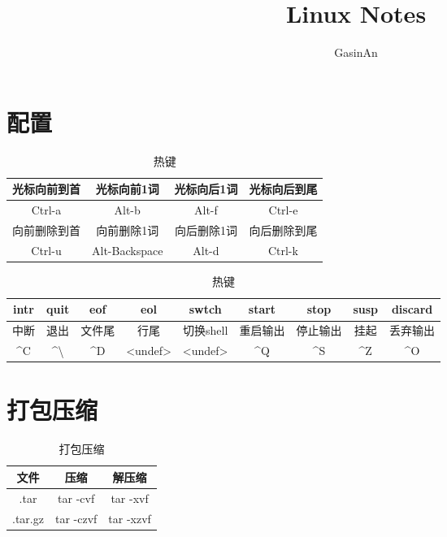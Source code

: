 \documentclass[12pt]{ctexart}
\title{Linux Notes}
\author{GasinAn}
\theoremstyle{definition}
\begin{document}
    \maketitle

    \tableofcontents

    \section{配置}

    \begin{table}[htbp]
        \centering
        \begin{tabular}{|c|c|c|c|}
            \hline
            光标向前到首 & 光标向前1词 & 光标向后1词 & 光标向后到尾 \\
            \hline
            Ctrl-a & Alt-b & Alt-f & Ctrl-e\\
            \hline
            向前删除到首 & 向前删除1词 & 向后删除1词 & 向后删除到尾 \\
            \hline
            Ctrl-u & Alt-Backspace & Alt-d & Ctrl-k\\
            \hline
        \end{tabular}
        \caption{热键}
    \end{table}

    \begin{table}[htbp]
        \centering
        \begin{tabular}{|c|c|c|c|c|c|c|c|c|}
            \hline
            intr & quit & eof & eol & swtch & start & stop & susp & discard \\
            \hline
            中断 & 退出 & 文件尾 & 行尾 & 切换shell & 重启输出 & 停止输出 & 挂起 & 丢弃输出 \\
            \hline
            \^{}C & \^{}\textbackslash & \^{}D & <undef> & <undef> & \^{}Q & \^{}S & \^{}Z & \^{}O \\
            \hline
        \end{tabular}
        \caption{热键}
    \end{table}

    \section{打包压缩}

    \begin{table}[htbp]
        \centering
        \begin{tabular}{|c|c|c}
            \hline
            文件 & 压缩 & 解压缩\\
            \hline
            .tar & tar -cvf & tar -xvf\\
            \hline
            .tar.gz & tar -czvf & tar -xzvf\\
            \hline
        \end{tabular}
        \caption{打包压缩}
    \end{table}
\end{document}
